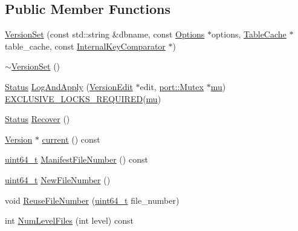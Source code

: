 \subsection*{Public Member Functions}
\begin{DoxyCompactItemize}
\item 
\hyperlink{classleveldb_1_1_version_set_a9e57cec002caced94f5355bb705bd52d}{Version\+Set} (const std\+::string \&dbname, const \hyperlink{structleveldb_1_1_options}{Options} $\ast$options, \hyperlink{classleveldb_1_1_table_cache}{Table\+Cache} $\ast$table\+\_\+cache, const \hyperlink{classleveldb_1_1_internal_key_comparator}{Internal\+Key\+Comparator} $\ast$)
\item 
\hyperlink{classleveldb_1_1_version_set_a53a424c5bb7699808193f150e3432e92}{$\sim$\+Version\+Set} ()
\item 
\hyperlink{classleveldb_1_1_status}{Status} \hyperlink{classleveldb_1_1_version_set_ac1d014901be7095ace1aaec0cf391fb6}{Log\+And\+Apply} (\hyperlink{classleveldb_1_1_version_edit}{Version\+Edit} $\ast$edit, \hyperlink{classleveldb_1_1port_1_1_mutex}{port\+::\+Mutex} $\ast$\hyperlink{db__impl_8cc_a900dad9ea326bf70a183d88a8ab50a13}{mu}) \hyperlink{threadsafety_8h_a0e2e86b0f11d9778240b0a0b263047b1}{E\+X\+C\+L\+U\+S\+I\+V\+E\+\_\+\+L\+O\+C\+K\+S\+\_\+\+R\+E\+Q\+U\+I\+R\+E\+D}(\hyperlink{db__impl_8cc_a900dad9ea326bf70a183d88a8ab50a13}{mu})
\item 
\hyperlink{classleveldb_1_1_status}{Status} \hyperlink{classleveldb_1_1_version_set_a955ff8620ec56742cdc48da0e74ab40b}{Recover} ()
\item 
\hyperlink{classleveldb_1_1_version}{Version} $\ast$ \hyperlink{classleveldb_1_1_version_set_a500747b987e66c51116287f26cfd028c}{current} () const 
\item 
\hyperlink{stdint_8h_aaa5d1cd013383c889537491c3cfd9aad}{uint64\+\_\+t} \hyperlink{classleveldb_1_1_version_set_a1e0d9925a9d909345ede866b9c504750}{Manifest\+File\+Number} () const 
\item 
\hyperlink{stdint_8h_aaa5d1cd013383c889537491c3cfd9aad}{uint64\+\_\+t} \hyperlink{classleveldb_1_1_version_set_ac4086c848479e74c1d9eb95e250e7167}{New\+File\+Number} ()
\item 
void \hyperlink{classleveldb_1_1_version_set_a8131cebf5be3283e2ce1029e8be0d14e}{Reuse\+File\+Number} (\hyperlink{stdint_8h_aaa5d1cd013383c889537491c3cfd9aad}{uint64\+\_\+t} file\+\_\+number)
\item 
int \hyperlink{classleveldb_1_1_version_set_a29d2d4a5aa83c12a1451743ca2a570fa}{Num\+Level\+Files} (int level) const 

\end{DoxyCompactItemize}

